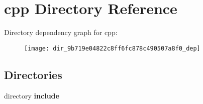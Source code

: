 \section{cpp Directory Reference}
\label{dir_9b719e04822c8ff6fc878c490507a8f0}
Directory dependency graph for cpp\-:
\nopagebreak
\begin{figure}[H]
\begin{center}
\leavevmode
\texttt{[image: dir\_9b719e04822c8ff6fc878c490507a8f0\_dep]}
\end{center}
\end{figure}
\subsection*{Directories}
\begin{DoxyCompactItemize}
\item 
directory {\bf include}
\end{DoxyCompactItemize}
